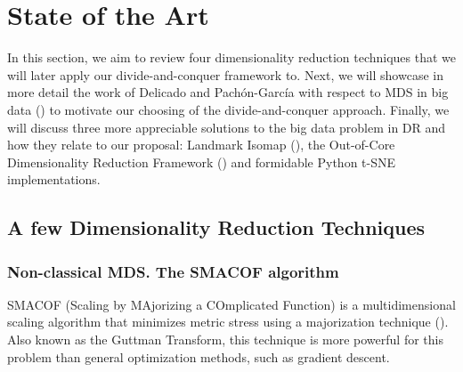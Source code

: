 \section{State of the Art}

In this section, we aim to review four dimensionality reduction techniques that we will later apply our divide-and-conquer framework to. Next, we will showcase in more detail the work of Delicado and Pachón-García with respect to MDS in big data (\cite{Delicado2024}) to motivate our choosing of the divide-and-conquer approach. Finally, we will discuss three more appreciable solutions to the big data problem in DR and how they relate to our proposal: Landmark Isomap (\cite{Silva2002}), the Out-of-Core Dimensionality Reduction Framework (\cite{Reichmann2024}) and formidable Python t-SNE implementations.

\subsection{A few Dimensionality Reduction Techniques}

\subsubsection{Non-classical MDS. The SMACOF algorithm}

SMACOF (Scaling by MAjorizing a COmplicated Function) is a multidimensional scaling algorithm that minimizes metric stress using a majorization technique (\cite{Borg1997}). Also known as the Guttman Transform, this technique is more powerful for this problem than general optimization methods, such as gradient descent.

